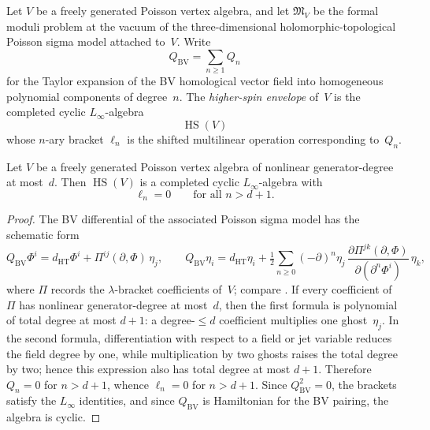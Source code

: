 \begin{definition}
\label{def:w-higher-spin-envelope}
Let $V$ be a freely generated Poisson vertex algebra, and let
$\mathfrak{M}_V$ be the formal moduli problem at the vacuum of the
three-dimensional holomorphic-topological Poisson sigma model
attached to~$V$.  Write
\[
Q_{\mathrm{BV}} = \sum_{n \ge 1} Q_n
\]
for the Taylor expansion of the BV homological vector field into
homogeneous polynomial components of degree~$n$.  The
\emph{higher-spin envelope} of~$V$ is the completed cyclic
$L_\infty$-algebra
\[
\operatorname{HS}(V)
\]
whose $n$-ary bracket $\ell_n$ is the shifted multilinear operation
corresponding to~$Q_n$.
\end{definition}

\begin{theorem}
\label{thm:w-finite-arity-polynomial-pva}
Let $V$ be a freely generated Poisson vertex algebra of nonlinear
generator-degree at most~$d$.  Then $\operatorname{HS}(V)$ is a
completed cyclic $L_\infty$-algebra with
\[
\ell_n = 0 \qquad \text{for all } n > d+1.
\]
\end{theorem}

\begin{proof}
The BV differential of the associated Poisson sigma model has the
schematic form
\[
Q_{\mathrm{BV}}\Phi^i
= d_{\mathrm{HT}}\Phi^i + \Pi^{ij}(\partial,\Phi)\,\eta_j,
\qquad
Q_{\mathrm{BV}}\eta_i
= d_{\mathrm{HT}}\eta_i
+ \tfrac{1}{2}\sum_{n \ge 0}(-\partial)^n \eta_j\,
\frac{\partial\Pi^{jk}(\partial,\Phi)}{\partial(\partial^n\Phi^i)}\,\eta_k,
\]
where $\Pi$ records the $\lambda$-bracket coefficients of~$V$; compare
\cite[\S3]{KhanZeng25}.  If every coefficient of~$\Pi$ has nonlinear
generator-degree at most~$d$, then the first formula is polynomial of
total degree at most $d+1$: a degree-$\le d$ coefficient multiplies
one ghost~$\eta_j$.  In the second formula, differentiation with
respect to a field or jet variable reduces the field degree by one,
while multiplication by two ghosts raises the total degree by two;
hence this expression also has total degree at most $d+1$.  Therefore
$Q_n = 0$ for $n > d+1$, whence $\ell_n = 0$ for $n > d+1$.  Since
$Q_{\mathrm{BV}}^2 = 0$, the brackets satisfy the $L_\infty$
identities, and since $Q_{\mathrm{BV}}$ is Hamiltonian for the BV
pairing, the algebra is cyclic.
\end{proof}

